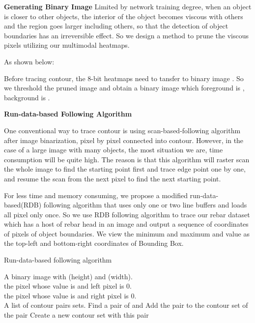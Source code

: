 \documentclass{article}
\begin{document}
{\textbf{Generating Binary Image}
Limited by network training degree, when an object is closer to other objects, the interior of the object becomes viscous with others and the region goes larger including others,
so that the detection of object boundaries has an irreversible effect.
So we design a method to prune the viscous pixels utilizing our multimodal heatmaps.

As shown below:

Before tracing contour, the 8-bit heatmaps need to tansfer to binary image \cite{suzuki1985topological}.
So we threshold the pruned image and obtain a binary image which foreground is , background is .



\textbf{Run-data-based Following Algorithm}

One conventional way to trace contour is using scan-based-following algorithm after image binarization, pixel by pixel connected into contour\cite{suzuki1985topological}.
However, in the case of a large image with many objects, the most situation we are, time consumption will be quite high\cite{s16030353}.
The reason is that this algorithm will raster scan the whole image to find the starting 
point first and trace edge point one by one, and resume the scan from the next pixel to find 
the next starting point.

For less time and memory consuming, we propose a modified run-data-based(RDB) following algorithm that uses only one or two line buffers and loads all pixel only once\cite{agrawala1977sequential}.
So we use RDB following algorithm to trace our rebar dataset which has a host of rebar head in an image and output a sequence of coordinates of pixels of object boundaries. We view the minimum and maximum  and  value as the top-left and bottom-right coordinates of Bounding Box.

\begin{algorithm}
  \caption{Run-data-based following algorithm\label{rdb}}
  \begin{algorithmic}[1]
     \Require
     A binary image with (height) and (width).\\
      the pixel  whose value is  and left pixel is 0.\\
      the pixel  whose value is  and right pixel is 0.\\
     \Ensure
     A list of contour pairs sets.
        \State Find a pair  of  and 
              \State Add the pair to the contour set of the pair 
           \Else
              \State Create a new contour set with this pair
           \EndIf
     \EndWhile
     \EndFor
  \end{algorithmic}
\end{algorithm}







}
\end{document}
